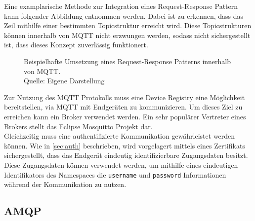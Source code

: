 \begin{example} Eine examplarische Methode zur Integration eines Request-Response Pattern kann folgender Abbildung entnommen werden. Dabei ist zu erkennen, dass das Zeil mithilfe einer bestimmten Topicstruktur erreicht wird. Diese Topicstrukturen können innerhalb von MQTT nicht erzwungen werden, sodass nicht sichergestellt ist, dass dieses Konzept zuverlässig funktionert.

    \begin{figure}[h]
        \centering
        \caption[Request-Response Pattern innerhalb von MQTT]{Beispielhafte Umsetzung eines Request-Response Patterns innerhalb von MQTT.\\Quelle: Eigene Darstellung}
    \end{figure}
\end{example}

Zur Nutzung des \ac{MQTT} Protokolls muss eine Device Registry eine Möglichkeit bereitstellen, via MQTT mit Endgeräten zu kommunizieren. Um dieses Ziel zu erreichen kann ein Broker verwendet werden. Ein sehr populärer Vertreter eines Brokers stellt das Eclipse Mosquitto Projekt dar.\\
Gleichzeitig muss eine authentifizierte Kommunikation gewährleistet werden können. Wie in \vref{sec:auth} beschrieben, wird vorgelagert mittels eines Zertifikats sichergestellt, dass das Endgerät eindeutig identifizierbare Zugangsdaten besitzt. Diese Zugangsdaten können verwendet werden, um mithilfe eines eindeutigen Identifikators des Namespaces die \texttt{username} und \texttt{password} Informationen während der Kommunikation zu nutzen.

\clearpage
\subsection{AMQP}

